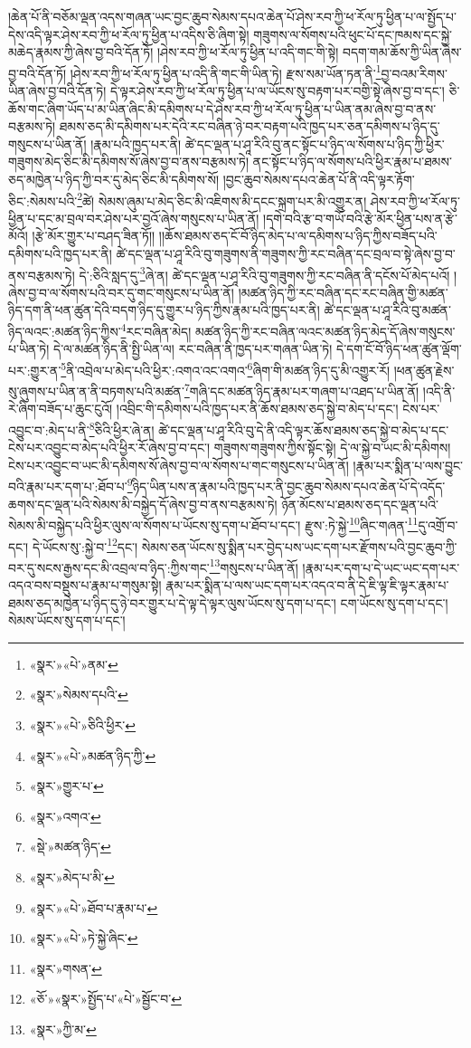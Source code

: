 །ཆེན་པོ་ནི་བཅོམ་ལྡན་འདས་གཞན་ཡང་བྱང་ཆུབ་སེམས་དཔའ་ཆེན་པོ་ཤེས་རབ་ཀྱི་ཕ་རོལ་ཏུ་ཕྱིན་པ་ལ་སྤྱོད་པ་དེས་འདི་ལྟར་ཤེས་རབ་ཀྱི་ཕ་རོལ་ཏུ་ཕྱིན་པ་འདིས་ཅི་ཞིག་སྟེ། གཟུགས་ལ་སོགས་པའི་ཕུང་པོ་དང་ཁམས་དང་སྐྱེ་མཆེད་རྣམས་ཀྱི་ཞེས་བྱ་བའི་དོན་ཏོ། །ཤེས་རབ་ཀྱི་ཕ་རོལ་ཏུ་ཕྱིན་པ་འདི་གང་གི་སྟེ། བདག་གམ་ཆོས་ཀྱི་ཡིན་ཞེས་བྱ་བའི་དོན་ཏོ། །ཤེས་རབ་ཀྱི་ཕ་རོལ་ཏུ་ཕྱིན་པ་འདི་ནི་གང་གི་ཡིན་ཏེ། རྫས་སམ་ཡོན་ཏན་ནི་\footnote{«སྣར་»«པེ་»ནམ་}བྱ་བའམ་རིགས་ཡིན་ཞེས་བྱ་བའི་དོན་ཏེ། དེ་ལྟར་ཤེས་རབ་ཀྱི་ཕ་རོལ་ཏུ་ཕྱིན་པ་ལ་ཡོངས་སུ་བརྟག་པར་བགྱི་སྟེ་ཞེས་བྱ་བ་དང་། ཅི་ཆོས་གང་ཞིག་ཡོད་པ་མ་ཡིན་ཞིང་མི་དམིགས་པ་དེ་ཤེས་རབ་ཀྱི་ཕ་རོལ་ཏུ་ཕྱིན་པ་ཡིན་ནམ་ཞེས་བྱ་བ་ནས་བརྩམས་ཏེ། ཐམས་ཅད་མི་དམིགས་པར་དེའི་རང་བཞིན་ཉེ་བར་བརྟག་པའི་ཁྱད་པར་ཅན་དམིགས་པ་ཉིད་དུ་གསུངས་པ་ཡིན་ནོ། །རྣམ་པའི་ཁྱད་པར་ནི། ཚེ་དང་ལྡན་པ་ཤཱ་རིའི་བུ་ནང་སྟོང་པ་ཉིད་ལ་སོགས་པ་ཉིད་ཀྱི་ཕྱིར་གཟུགས་མེད་ཅིང་མི་དམིགས་སོ་ཞེས་བྱ་བ་ནས་བརྩམས་ཏེ། ནང་སྟོང་པ་ཉིད་ལ་སོགས་པའི་ཕྱིར་རྣམ་པ་ཐམས་ཅད་མཁྱེན་པ་ཉིད་ཀྱི་བར་དུ་མེད་ཅིང་མི་དམིགས་སོ། །བྱང་ཆུབ་སེམས་དཔའ་ཆེན་པོ་ནི་འདི་ལྟར་རྟོག་ཅིང་:སེམས་པའི་\footnote{«སྣར་»སེམས་དཔའི་}ཚེ། སེམས་ཞུམ་པ་མེད་ཅིང་མི་འཇིགས་མི་དངང་སྐྲག་པར་མི་འགྱུར་ན། ཤེས་རབ་ཀྱི་ཕ་རོལ་ཏུ་ཕྱིན་པ་དང་མ་བྲལ་བར་ཤེས་པར་བྱའོ་ཞེས་གསུངས་པ་ཡིན་ནོ། །དགེ་བའི་རྩ་བ་གཡོ་བའི་རྩེ་མོར་ཕྱིན་པས་ན་རྩེ་མོའོ། །རྩེ་མོར་གྱུར་པ་བཤད་ཟིན་ཏོ།། །།ཆོས་ཐམས་ཅད་ངོ་བོ་ཉིད་མེད་པ་ལ་དམིགས་པ་ཉིད་ཀྱིས་བཟོད་པའི་དམིགས་པའི་ཁྱད་པར་ནི། ཚེ་དང་ལྡན་པ་ཤཱ་རིའི་བུ་གཟུགས་ནི་གཟུགས་ཀྱི་རང་བཞིན་དང་བྲལ་བ་སྟེ་ཞེས་བྱ་བ་ནས་བརྩམས་ཏེ། དེ་:ཅིའི་སླད་དུ་\footnote{«སྣར་»«པེ་»ཅིའི་ཕྱིར་}ཞེ་ན། ཚེ་དང་ལྡན་པ་ཤཱ་རིའི་བུ་གཟུགས་ཀྱི་རང་བཞིན་ནི་དངོས་པོ་མེད་པའོ། །ཞེས་བྱ་བ་ལ་སོགས་པའི་བར་དུ་གང་གསུངས་པ་ཡིན་ནོ། །མཚན་ཉིད་ཀྱི་རང་བཞིན་དང་རང་བཞིན་གྱི་མཚན་ཉིད་དག་ནི་ཕན་ཚུན་དེའི་བདག་ཉིད་དུ་གྱུར་པ་ཉིད་ཀྱིས་རྣམ་པའི་ཁྱད་པར་ནི། ཚེ་དང་ལྡན་པ་ཤཱ་རིའི་བུ་མཚན་ཉིད་ལའང་:མཚན་ཉིད་ཀྱིས་\footnote{«སྣར་»«པེ་»མཚན་ཉིད་ཀྱི་}རང་བཞིན་མེད། མཚན་ཉིད་ཀྱི་རང་བཞིན་ལའང་མཚན་ཉིད་མེད་དོ་ཞེས་གསུངས་པ་ཡིན་ཏེ། དེ་ལ་མཚན་ཉིད་ནི་སྤྱི་ཡིན་ལ། རང་བཞིན་ནི་ཁྱད་པར་གཞན་ཡིན་ཏེ། དེ་དག་ངོ་བོ་ཉིད་ཕན་ཚུན་ལྡོག་པར་:གྱུར་ན་\footnote{«སྣར་»གྱུར་པ་}ནི་འབྲེལ་པ་མེད་པའི་ཕྱིར་:འགའ་འང་འགའ་\footnote{«སྣར་»འགའ་}ཞིག་གི་མཚན་ཉིད་དུ་མི་འགྱུར་རོ། །ཕན་ཚུན་རྗེས་སུ་ཞུགས་པ་ཡིན་ན་ནི་བཏགས་པའི་མཚན་\footnote{«སྡེ་»མཚན་ཉིད་}གཞི་དང་མཚན་ཉིད་རྣམ་པར་གཞག་པ་འཐད་པ་ཡིན་ནོ། །འདི་ནི་རེ་ཞིག་བཟོད་པ་ཆུང་ངུའོ། །འབྲིང་གི་དམིགས་པའི་ཁྱད་པར་ནི་ཆོས་ཐམས་ཅད་སྐྱེ་བ་མེད་པ་དང་། ངེས་པར་འབྱུང་བ་:མེད་པ་ནི་\footnote{«སྣར་»མེད་པ་མི་}ཅིའི་ཕྱིར་ཞེ་ན། ཚེ་དང་ལྡན་པ་ཤཱ་རིའི་བུ་དེ་ནི་འདི་ལྟར་ཆོས་ཐམས་ཅད་སྐྱེ་བ་མེད་པ་དང་ངེས་པར་འབྱུང་བ་མེད་པའི་ཕྱིར་རོ་ཞེས་བྱ་བ་དང་། གཟུགས་གཟུགས་ཀྱིས་སྟོང་སྟེ། དེ་ལ་སྐྱེ་བ་ཡང་མི་དམིགས། ངེས་པར་འབྱུང་བ་ཡང་མི་དམིགས་སོ་ཞེས་བྱ་བ་ལ་སོགས་པ་གང་གསུངས་པ་ཡིན་ནོ། །རྣམ་པར་སྨིན་པ་ལས་བྱུང་བའི་རྣམ་པར་དག་པ་:ཐོབ་པ་\footnote{«སྣར་»«པེ་»ཐོབ་པ་རྣམ་པ་}ཉིད་ཡིན་པས་ན་རྣམ་པའི་ཁྱད་པར་ནི་བྱང་ཆུབ་སེམས་དཔའ་ཆེན་པོ་དེ་འདོད་ཆགས་དང་ལྡན་པའི་སེམས་མི་བསྐྱེད་དོ་ཞེས་བྱ་བ་ནས་བརྩམས་ཏེ། ཉོན་མོངས་པ་ཐམས་ཅད་དང་ལྡན་པའི་སེམས་མི་བསྐྱེད་པའི་ཕྱིར་ལུས་ལ་སོགས་པ་ཡོངས་སུ་དག་པ་ཐོབ་པ་དང་། རྫུས་:ཏེ་སྐྱེ་\footnote{«སྣར་»«པེ་»ཏེ་སྐྱེ་ཞིང་}ཞིང་གཞན་\footnote{«སྣར་»གསན་}དུ་འགྲོ་བ་དང་། དེ་ཡོངས་སུ་:སྐྱེ་བ་\footnote{«ཅོ་»«སྣར་»སྤྱོད་པ་«པེ་»སྦྱོང་བ་}དང་། སེམས་ཅན་ཡོངས་སུ་སྨིན་པར་བྱེད་པས་ཡང་དག་པར་རྫོགས་པའི་བྱང་ཆུབ་ཀྱི་བར་དུ་སངས་རྒྱས་དང་མི་འབྲལ་བ་ཉིད་:ཀྱིས་གང་\footnote{«སྣར་»ཀྱི་མ་}གསུངས་པ་ཡིན་ནོ། །རྣམ་པར་དག་པ་དེ་ཡང་ཡང་དག་པར་འདའ་བས་བསྡུས་པ་རྣམ་པ་གསུམ་སྟེ། རྣམ་པར་སྨིན་པ་ལས་ཡང་དག་པར་འདའ་བ་ནི་དེ་ཇི་ལྟ་ཇི་ལྟར་རྣམ་པ་ཐམས་ཅད་མཁྱེན་པ་ཉིད་དུ་ཉེ་བར་གྱུར་པ་དེ་ལྟ་དེ་ལྟར་ལུས་ཡོངས་སུ་དག་པ་དང་། ངག་ཡོངས་སུ་དག་པ་དང་། སེམས་ཡོངས་སུ་དག་པ་དང་། 
